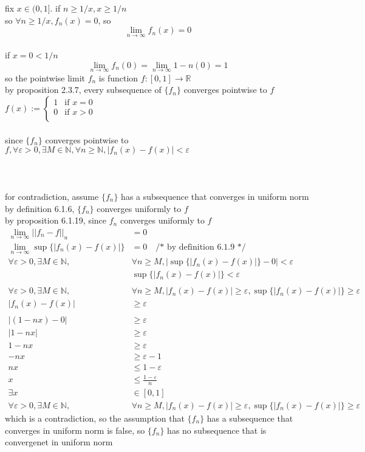 \documentclass[12pt, border = 4pt, multi]{article} %
\begin{document}
fix $x \in (0, 1]$. if $n \geq 1 / x, x \geq 1 / n$\\
so $\forall n \geq 1 / x, f_n(x) = 0$, so
\[\lim_{n \rightarrow \infty} f_n(x) = 0\]
\\
if $x = 0 < 1 / n$
\[\lim_{n \rightarrow \infty} f_n(0) = \lim_{n \rightarrow \infty} 1 - n(0) = 1\]
so the pointwise limit $f_n$ is function $f: [0, 1] \rightarrow \mathbb{R}$\\
by proposition 2.3.7, every subsequence of $\{f_n\}$ converges pointwise to $f$\\
$f(x) :=
\begin{cases}
1 & \text{if } x = 0\\
0 & \text{if } x > 0\\
\end{cases}$
\\
\\
since $\{f_n\}$ converges pointwise to $f, \forall \varepsilon > 0, \exists M \in \mathbb{N}, \forall n \geq \mathbb{N}, |f_n(x) - f(x)| < \varepsilon$\\
\\
\\
\\
for contradiction, assume $\{f_n\}$ has a subsequence that converges in uniform norm\\
by definition 6.1.6, $\{f_n\}$ converges uniformly to $f$\\
by proposition 6.1.19, since $f_n$ converges uniformly to $f$
\begin{align*}
\lim_{n \rightarrow \infty} ||f_n - f||_u &= 0\\
\lim_{n \rightarrow \infty} \sup\{|f_n(x) - f(x)|\} &= 0 \quad\text{/* by definition 6.1.9 */}\\
\forall \varepsilon > 0, \exists M \in \mathbb{N}, &\forall n \geq M, |\sup\{|f_n(x) - f(x)|\} - 0| < \varepsilon\\
&\sup\{|f_n(x) - f(x)|\} < \varepsilon\\
\\
\forall \varepsilon > 0, \exists M \in \mathbb{N}, &\forall n \geq M, |f_n(x) - f(x)| \geq \varepsilon, \sup\{|f_n(x) - f(x)|\} \geq \varepsilon\\
|f_n(x) - f(x)| &\geq \varepsilon\\
\\
|(1 - nx) - 0| &\geq \varepsilon\\
|1 - nx| &\geq \varepsilon\\
1 - nx &\geq \varepsilon\\
-nx &\geq \varepsilon - 1\\
nx &\leq 1 - \varepsilon\\
x &\leq \frac{1 - \varepsilon}{n}\\
\exists x &\in [0, 1]\\
\forall \varepsilon > 0, \exists M \in \mathbb{N}, &\forall n \geq M, |f_n(x) - f(x)| \geq \varepsilon, \sup\{|f_n(x) - f(x)|\} \geq \varepsilon
\end{align*}
which is a contradiction, so the assumption that $\{f_n\}$ has a subsequence that converges in uniform norm is false, so $\{f_n\}$ has no subsequence that is convergenet in uniform norm
\end{document}
